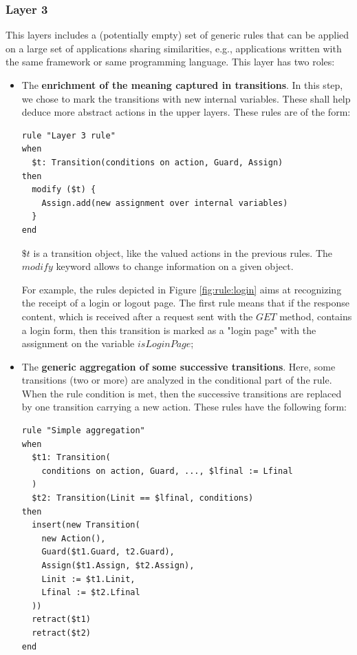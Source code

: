 \subsubsection{Layer 3}

This layers includes a (potentially empty) set of generic rules
that can be applied on a large set of applications sharing
similarities, e.g., applications written with the same framework
or same programming language.  This layer has two roles:

\begin{itemize}
\item The \textbf{enrichment of the meaning captured in
    transitions}. In this step, we chose to mark the transitions
    with new internal variables. These shall help deduce more
    abstract actions in the upper layers. These rules are of the
    form:

\begin{BVerbatim}
rule "Layer 3 rule"
when
  $t: Transition(conditions on action, Guard, Assign)
then
  modify ($t) {
    Assign.add(new assignment over internal variables)
  }
end
\end{BVerbatim}

$\$t$ is a transition object, like the valued actions in the
previous rules. The $modify$ keyword allows to change information
on a given object.

For example, the rules depicted in Figure \ref{fig:rule:login}
aims at recognizing the receipt of a login or logout page. The
first rule means that if the response content, which is received
after a request sent with the $GET$ method, contains a login
form, then this transition is marked as a "login page" with the
assignment on the variable $isLoginPage$;

\item The \textbf{generic aggregation of some successive
    transitions}. Here, some transitions (two or more) are
    analyzed in the conditional part of the rule. When the rule
    condition is met, then the successive transitions are replaced
    by one transition carrying a new action. These rules have the
    following form:

\begin{verbatim}
rule "Simple aggregation"
when
  $t1: Transition(
    conditions on action, Guard, ..., $lfinal := Lfinal
  )
  $t2: Transition(Linit == $lfinal, conditions)
then
  insert(new Transition(
    new Action(),
    Guard($t1.Guard, t2.Guard),
    Assign($t1.Assign, $t2.Assign),
    Linit := $t1.Linit,
    Lfinal := $t2.Lfinal
  ))
  retract($t1)
  retract($t2)
end
\end{verbatim}


\end{itemize}

